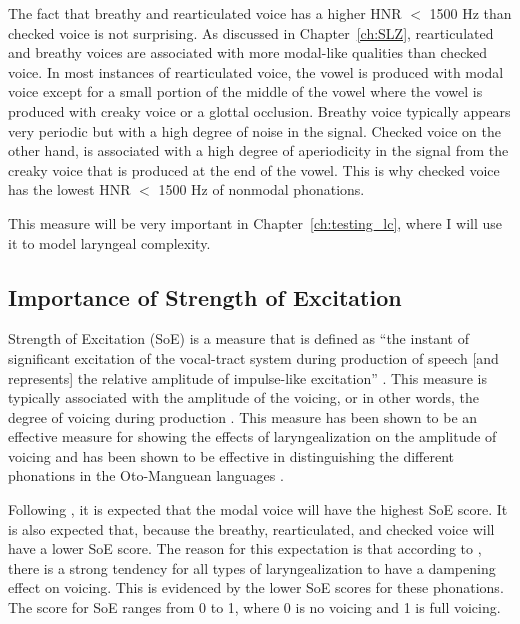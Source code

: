 The fact that breathy and rearticulated voice has a higher HNR $<$ 1500 Hz than checked voice is not surprising. As discussed in Chapter~\ref{ch:SLZ}, rearticulated and breathy voices are associated with more modal-like qualities than checked voice. In most instances of rearticulated voice, the vowel is produced with modal voice except for a small portion of the middle of the vowel where the vowel is produced with creaky voice or a glottal occlusion. Breathy voice typically appears very periodic but with a high degree of noise in the signal. Checked voice on the other hand, is associated with a high degree of aperiodicity in the signal from the creaky voice that is produced at the end of the vowel. This is why checked voice has the lowest HNR $<$ 1500 Hz of nonmodal phonations.

This measure will be very important in Chapter~\ref{ch:testing_lc}, where I will use it to model laryngeal complexity.

\subsection{Importance of Strength of Excitation} \label{sec:dt_soe}

Strength of Excitation (SoE) is a measure that is defined as ``the instant of significant excitation of the vocal-tract system during production of speech [and represents] the relative amplitude of impulse-like excitation'' \citep[1934]{mittalStudyEffectsVocal2014}. This measure is typically associated with the amplitude of the voicing, or in other words, the degree of voicing during production \citep{murtyEpochExtractionSpeech2008,mittalStudyEffectsVocal2014}. This measure has been shown to be an effective measure for showing the effects of laryngealization on the amplitude of voicing \citep{garellekVoicingGlottalConsonants2021} and has been shown to be effective in distinguishing the different phonations in the Oto-Manguean languages \citep{chaiPhoneticsGlottalizedPhonations2023,wellerInteractionsToneGlottalization2023,wellerLexicalToneVowel2023,wellerVoiceQualityTone2024}.

Following \citet{garellekVoicingGlottalConsonants2021}, it is expected that the modal voice will have the highest SoE score. It is also expected that, because the breathy, rearticulated, and checked voice will have a lower SoE score. The reason for this expectation is that according to \citet{garellekVoicingGlottalConsonants2021}, there is a strong tendency for all types of laryngealization to have a dampening effect on voicing. This is evidenced by the lower SoE scores for these phonations. The score for SoE ranges from 0 to 1, where 0 is no voicing and 1 is full voicing. 

